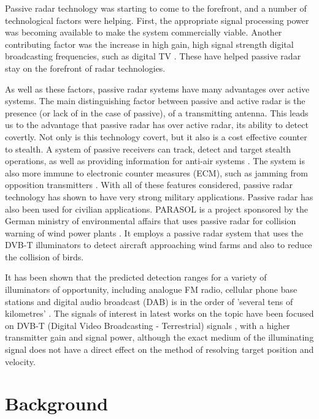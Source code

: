 \documentclass[12pt,openany,a4paper]{book}
\begin{document}
\bigskip

Passive radar technology was starting to come to the forefront, and a number of technological factors were helping. First, the appropriate signal processing power was becoming available to make the system commercially viable. Another contributing factor was the increase in high gain, high signal strength digital broadcasting frequencies, such as digital TV \cite{JE8}. These have helped passive radar stay on the forefront of radar technologies.

\bigskip

As well as these factors, passive radar systems have many advantages over active systems. The main distinguishing factor between passive and active radar is the presence (or lack of in the case of passive), of a transmitting antenna. This leads us to the advantage that passive radar has over active radar, its ability to detect covertly. Not only is this technology covert, but it also is a cost effective counter to stealth. A system of passive receivers can track, detect and target stealth operations, as well as providing information for anti-air systems \cite{Arend}. The system is also more immune to electronic counter measures (ECM), such as jamming from opposition transmitters \cite{HK6}. With all of these features considered, passive radar technology has shown to have very strong military applications. Passive radar has also been used for civilian applications. PARASOL is a project sponsored by the German ministry of environmental affairs that uses passive radar for collision warning of wind power plants \cite{HK5}. It employs a passive radar system that uses the DVB-T illuminators to detect aircraft approaching wind farms and also to reduce the collision of birds.

\bigskip

It has been shown that the predicted detection ranges for a variety of illuminators of opportunity, including analogue FM radio, cellular phone base stations and digital audio broadcast (DAB) is in the order of 'several tens of kilometres' \cite{HD9}. The signals of interest in latest works on the topic have been focused on DVB-T (Digital Video Broadcasting - Terrestrial) signals \cite{gcc,MB11,MC12,MK13}, with a higher transmitter gain and signal power, although the exact medium of the illuminating signal does not have a direct effect on the method of resolving target position and velocity.

\cleardoublepage

\chapter{Background}
\end{document}
